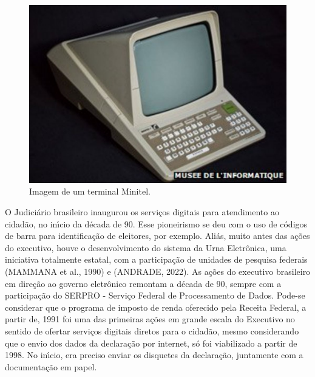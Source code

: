 \documentclass[
12pt,		%
openright,	%
twoside,  %
a4paper,			%
chapter=TITLE,		%
english,			%
french,				%
spanish,			%
brazil				%
]{USPSC-classe/USPSC}
\begin{document}
\captionsetup{format=plain}
\begin{figure}[max size={\textwidth}{\textheight}]

\centering


\begin{minipage}[b]{0.4\linewidth}
        \centering
                \includegraphics[width=1.0\linewidth]{../../imagens/minitel.jpg}
                \caption{Imagem de um terminal Minitel.}
                \label{5d9a2782548e094108d5241aeff768916b33be6c}
\end{minipage}%
\hspace{0.5cm}
\end{figure}



O Judici\'ario brasileiro inaugurou os servi\c{c}os digitais para atendimento ao cidad\~ao, no in\'{\i}cio da d\'ecada de 90. Esse pioneirismo se deu com o uso de c\'odigos de barra para identifica\c{c}\~ao de eleitores, por exemplo. Ali\'as, muito antes das a\c{c}\~oes do executivo, houve o desenvolvimento do sistema da Urna Eletr\^onica, uma iniciativa totalmente estatal, com a participa\c{c}\~ao de unidades de pesquisa federais  (MAMMANA et al., 1990) e (ANDRADE, 2022). As a\c{c}\~oes do executivo brasileiro em dire\c{c}\~ao ao governo eletr\^onico remontam a d\'ecada de 90, sempre com a participa\c{c}\~ao do SERPRO - Servi\c{c}o Federal de Processamento de Dados. Pode-se considerar que o programa de imposto de renda oferecido pela Receita Federal, a partir de, 1991 foi uma das primeiras a\c{c}\~oes em grande escala do Executivo no sentido de ofertar servi\c{c}os digitais diretos para o cidad\~ao, mesmo considerando que o envio dos dados da declara\c{c}\~ao por internet, s\'o foi viabilizado a partir de 1998. No in\'{\i}cio, era preciso enviar os disquetes da declara\c{c}\~ao, juntamente com a documenta\c{c}\~ao em papel.
\end{document}
